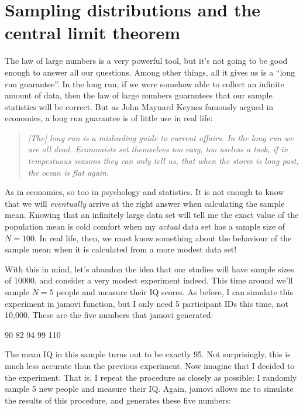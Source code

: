 \section{Sampling distributions and the central limit theorem~\label{sec:samplesandclt}}

The law of large numbers is a very powerful tool, but it's not going to be good enough to answer all our questions. Among other things, all it gives us is a ``long run guarantee''. In the long run, if we were somehow able to collect an infinite amount of data, then the law of large numbers guarantees that our sample statistics will be correct. But as John Maynard Keynes famously argued in economics, a long run guarantee is of little use in real life:
\begin{quote}
{\it [The] long run is a misleading guide to current affairs. In the long run we are all dead. Economists set themselves too easy, too useless a task, if in tempestuous seasons they can only tell us, that when the storm is long past, the ocean is flat again.} \cite[p.~80]{Keynes1923}
\end{quote}
As in economics, so too in psychology and statistics. It is not enough to know that we will {\it eventually} arrive at the right answer when calculating the sample mean. Knowing that an infinitely large data set will tell me the exact value of the population mean is cold comfort when my {\it actual} data set has a sample size of $N=100$. In real life, then, we must know something about the behaviour of the sample mean when it is calculated from a more modest data set!


With this in mind, let's abandon the idea that our studies will have sample sizes of 10000, and consider a very modest experiment indeed. This time around we'll sample $N=5$ people and measure their IQ scores. As before, I can simulate this experiment in jamovi  function, but I only need 5 participant IDs this time, not 10,000. These are the five numbers that jamovi generated:

\begin{rblock1}
90 82 94 99 110
\end{rblock1}

The mean IQ in this sample turns out to be exactly 95. Not surprisingly, this is much less accurate than the previous experiment. Now imagine that I decided to  the experiment. That is, I repeat the procedure as closely as possible: I randomly sample 5 new people and measure their IQ. Again, jamovi allows me to simulate the results of this procedure, and generates these five numbers:

